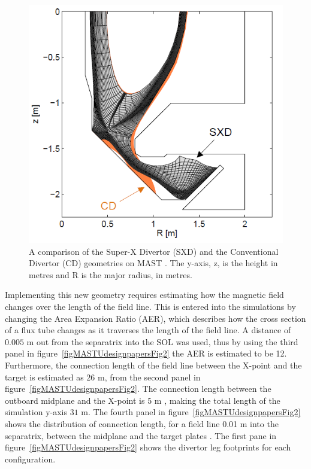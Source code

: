 \documentclass[12pt]{article}  %
\begin{document}
\begin{figure}
\includegraphics[scale=0.5]{Figures/CDvsSXD.png}
\centering
\caption{A comparison of the Super-X Divertor (SXD) and the Conventional Divertor (CD) geometries on MAST \cite{Havlickova2014}. The y-axis, z, is the height in metres and R is the major radius, in metres.}\label{figCDvsSXD}
\end{figure}

Implementing this new geometry requires estimating how the magnetic field changes over the length of the field line. This is entered into the simulations by changing the Area Expansion Ratio (AER), which describes how the cross section of a flux tube changes as it traverses the length of the field line. A distance of $0.005$ m out from the separatrix into the SOL was used, thus by using the third panel in figure~\ref{figMASTUdesignpapersFig2} the AER is estimated to be 12. Furthermore, the connection length of the field line between the X-point and the target is estimated as $26$ m, from the second panel in figure~\ref{figMASTUdesignpapersFig2}. The connection length between the outboard midplane and the X-point is $5$ m \cite{Fishpool2013}, making the total length of the simulation y-axis $31$ m. The fourth panel in figure~\ref{figMASTUdesignpapersFig2} shows the distribution of connection length, for a field line 0.01 m into the separatrix, between the midplane and the target plates \cite{Fishpool2013}. The first pane in figure~\ref{figMASTUdesignpapersFig2} shows the divertor leg footprints for each configuration.
\end{document}

